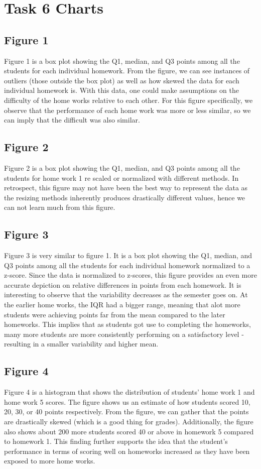 \documentclass{article}
\begin{document}
\section{Task 6 Charts}
\subsection{Figure 1} 
Figure 1 is a box plot showing the Q1, median, and Q3 points among all the students for each individual homework. From the figure, we can see instances of outliers (those outside the box plot) as well as how skewed the data for each individual homework is. With this data, one could make assumptions on the difficulty of the home works relative to each other. For this figure specifically, we observe that the performance of each home work was more or less similar, so we can imply that the difficult was also similar.

\subsection{Figure 2}
Figure 2 is a box plot showing the Q1, median, and Q3 points among all the students for home work 1 re scaled or normalized with different methods. In retrospect, this figure may not have been the best way to represent the data as the resizing methods inherently produces drastically different values, hence we can not learn much from this figure.

\subsection{Figure 3}
Figure 3 is very similar to figure 1. It is a box plot showing the Q1, median, and Q3 points among all the students for each individual homework normalized to a z-score. Since the data is normalized to z-scores, this figure provides an even more accurate depiction on relative differences in points from each homework. It is interesting to observe that the variability decreases as the semester goes on. At the earlier home works, the IQR had a bigger range, meaning that alot more students were achieving points far from the mean compared to the later homeworks. This implies that as students got use to completing the homeworks, many more students are more consistently performing on a satisfactory level -resulting in a smaller variability and higher mean.

\subsection{Figure 4}
Figure 4 is a histogram that shows the distribution of students' home work 1 and home work 5 scores. The figure shows us an estimate of how students scored 10, 20, 30, or 40 points respectively. From the figure, we can gather that the points are drastically skewed (which is a good thing for grades). Additionally, the figure also shows about 200 more students scored 40 or above in homework 5 compared to homework 1. This finding further supports the idea that the student's performance in terms of scoring well on homeworks increased as they have been exposed to more home works.
\end{document}
